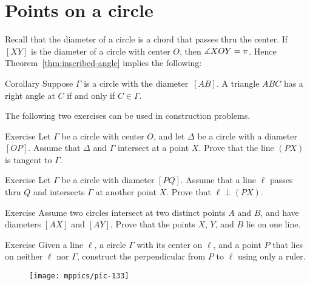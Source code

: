 \section{Points on a circle}

Recall that the diameter of a circle is a chord that passes thru the center.
If $[XY]$ is the diameter of a circle with center $O$, then $\measuredangle X O Y=\pi$. 
Hence Theorem~\ref{thm:inscribed-angle} implies the following:


\begin{thm}{Corollary}\label{cor:right-angle-diameter}
Suppose $\Gamma$ is a circle with the diameter~$[AB]$.
A triangle $ABC$ has a right angle at $C$ if and only if $C\in\Gamma$.
\end{thm}

The following two exercises can be used in construction problems.

\begin{thm}{Exercise}\label{ex:tangent-construction-inscribed}
Let $\Gamma$ be a circle with center $O$, and let $\Delta$ be a circle with a diameter $[OP]$.
Assume that $\Delta$ and $\Gamma$ intersect at a point $X$.
Prove that the line $(PX)$ is tangent to $\Gamma$.
\end{thm}

\begin{thm}{Exercise}\label{ex:perp-construction-inscribed}
Let $\Gamma$ be a circle with diameter $[PQ]$.
Assume that a line $\ell$ passes thru $Q$ and intersects $\Gamma$ at another point $X$.
Prove that $\ell \perp (PX)$.
\end{thm}



\begin{thm}{Exercise}\label{ex:altitude+circles}
Assume two circles intersect at two distinct points $A$ and $B$, and have diameters $[AX]$ and $[AY]$.
Prove that the points $X$, $Y$, and $B$ lie on one line.
\end{thm}

\begin{thm}{Exercise}\label{ex:perpendicular-ruler}
Given a line $\ell$, a circle $\Gamma$ with its center on $\ell$,
and a point $P$ that lies on neither $\ell$ nor $\Gamma$,
construct the perpendicular from $P$ to $\ell$ using only a ruler.
\end{thm}

\begin{wrapfigure}{r}{32mm}
\vskip-4mm
\centering
\texttt{[image: mppics/pic-133]}
\end{wrapfigure}

